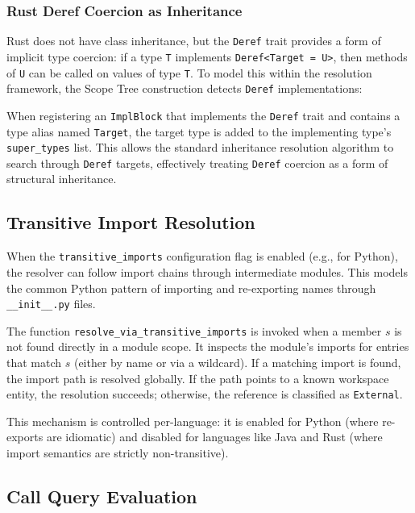 \subsubsection{Rust Deref Coercion as Inheritance}

Rust does not have class inheritance, but the \texttt{Deref} trait
provides a form of implicit type coercion: if a type \texttt{T}
implements \texttt{Deref<Target = U>}, then methods of \texttt{U} can
be called on values of type \texttt{T}. To model this within the
resolution framework, the Scope Tree construction detects
\texttt{Deref} implementations:

When registering an \texttt{ImplBlock} that implements the
\texttt{Deref} trait and contains a type alias named \texttt{Target},
the target type is added to the implementing type's
\texttt{super\_types} list. This allows the standard inheritance
resolution algorithm to search through \texttt{Deref} targets,
effectively treating \texttt{Deref} coercion as a form of structural
inheritance.

\subsection{Transitive Import Resolution}
\label{sec:transitive_imports}

When the \texttt{transitive\_imports} configuration flag is enabled
(e.g., for Python), the resolver can follow import chains through
intermediate modules. This models the common Python pattern of
importing and re-exporting names through \texttt{\_\_init\_\_.py} files.

The function \texttt{resolve\_via\_transitive\_imports} is invoked
when a member $s$ is not found directly in a module scope. It
inspects the module's imports for entries that match $s$ (either by
name or via a wildcard). If a matching import is found, the import
path is resolved globally. If the path points to a known workspace
entity, the resolution succeeds; otherwise, the reference is
classified as \texttt{External}.

This mechanism is controlled per-language: it is enabled for Python
(where re-exports are idiomatic) and disabled for languages like Java
and Rust (where import semantics are strictly non-transitive).

\subsection{Call Query Evaluation}

